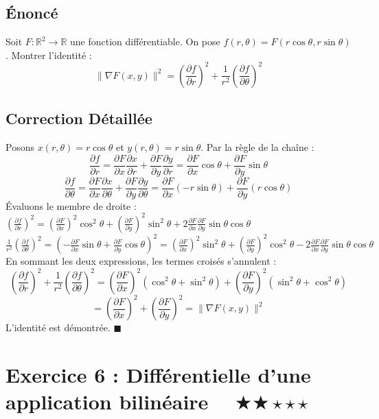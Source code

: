 \documentclass[11pt,a4paper]{article}
\begin{document}
\subsection*{Énoncé}
Soit $F : \mathbb{R}^2 \to \mathbb{R}$ une fonction différentiable. On pose $f(r, \theta) = F(r \cos \theta, r \sin \theta)$.
Montrer l'identité :
$$ \|\nabla F(x,y)\|^2 = \left( \frac{\partial f}{\partial r} \right)^2 + \frac{1}{r^2} \left( \frac{\partial f}{\partial \theta} \right)^2 $$
\subsection*{Correction Détaillée}
Posons $x(r,\theta) = r\cos\theta$ et $y(r,\theta) = r\sin\theta$.
Par la règle de la chaîne :
$$ \frac{\partial f}{\partial r} = \frac{\partial F}{\partial x} \frac{\partial x}{\partial r} + \frac{\partial F}{\partial y} \frac{\partial y}{\partial r} = \frac{\partial F}{\partial x} \cos\theta + \frac{\partial F}{\partial y} \sin\theta $$
$$ \frac{\partial f}{\partial \theta} = \frac{\partial F}{\partial x} \frac{\partial x}{\partial \theta} + \frac{\partial F}{\partial y} \frac{\partial y}{\partial \theta} = \frac{\partial F}{\partial x} (-r\sin\theta) + \frac{\partial F}{\partial y} (r\cos\theta) $$
Évaluons le membre de droite :
$\left( \frac{\partial f}{\partial r} \right)^2 = \left(\frac{\partial F}{\partial x}\right)^2 \cos^2\theta + \left(\frac{\partial F}{\partial y}\right)^2 \sin^2\theta + 2\frac{\partial F}{\partial x}\frac{\partial F}{\partial y}\sin\theta\cos\theta$
$\frac{1}{r^2}\left( \frac{\partial f}{\partial \theta} \right)^2 = \left(-\frac{\partial F}{\partial x}\sin\theta + \frac{\partial F}{\partial y}\cos\theta\right)^2 = \left(\frac{\partial F}{\partial x}\right)^2 \sin^2\theta + \left(\frac{\partial F}{\partial y}\right)^2 \cos^2\theta - 2\frac{\partial F}{\partial x}\frac{\partial F}{\partial y}\sin\theta\cos\theta$
En sommant les deux expressions, les termes croisés s'annulent :
$$ \left( \frac{\partial f}{\partial r} \right)^2 + \frac{1}{r^2} \left( \frac{\partial f}{\partial \theta} \right)^2 = \left(\frac{\partial F}{\partial x}\right)^2(\cos^2\theta + \sin^2\theta) + \left(\frac{\partial F}{\partial y}\right)^2(\sin^2\theta + \cos^2\theta) $$
$$ = \left(\frac{\partial F}{\partial x}\right)^2 + \left(\frac{\partial F}{\partial y}\right)^2 = \|\nabla F(x,y)\|^2 $$
L'identité est démontrée.
$\blacksquare$

\newpage
\section*{Exercice 6 : Différentielle d'une application bilinéaire $\quad \bigstar\bigstar\star\star\star$}
\end{document}
